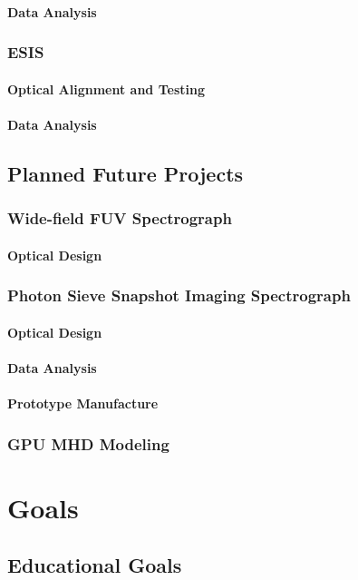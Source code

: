 \documentclass[10pt,letterpaper]{article}
\begin{document}
				\paragraph{Data Analysis}
			\subsubsection{ESIS}
				\paragraph{Optical Alignment and Testing}
				\paragraph{Data Analysis}
		\subsection{Planned Future Projects}
			\subsubsection{Wide-field FUV Spectrograph}
				 \paragraph{Optical Design}
			\subsubsection{Photon Sieve Snapshot Imaging Spectrograph}
				\paragraph{Optical Design}
				\paragraph{Data Analysis}
				\paragraph{Prototype Manufacture}
			\subsubsection{GPU MHD Modeling}
			
	\section{Goals}
		\subsection{Educational Goals}
\end{document}
